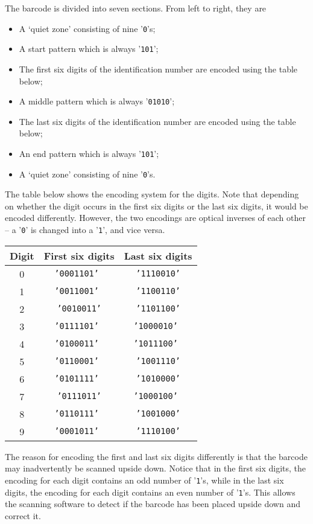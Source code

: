\noindent The barcode is divided into seven sections. From left to
right, they are
\begin{itemize}
\item A \textquoteleft quiet zone\textquoteright{} consisting of nine '\texttt{0}'s; 
\item A start pattern which is always '\texttt{101}'; 
\item The first six digits of the identification number are encoded using
the table below; 
\item A middle pattern which is always '\texttt{01010}'; 
\item The last six digits of the identification number are encoded using
the table below; 
\item An end pattern which is always '\texttt{101}'; 
\item A \textquoteleft quiet zone\textquoteright{} consisting of nine '\texttt{0}'s.
\end{itemize}
\noindent The table below shows the encoding system for the digits.
Note that depending on whether the digit occurs in the first six digits
or the last six digits, it would be encoded differently. However,
the two encodings are optical inverses of each other -- a '\texttt{0}'
is changed into a '\texttt{1}', and vice versa.
\noindent \begin{center}
\begin{tabular}{|c|c|c|}
\hline 
Digit  & First six digits & Last six digits\tabularnewline
\hline 
0  & \texttt{'0001101' } & \texttt{'1110010'}\tabularnewline
\hline 
1  & \texttt{'0011001' } & \texttt{'1100110'}\tabularnewline
\hline 
2  & \texttt{'0010011'} & \texttt{'1101100'}\tabularnewline
\hline 
3  & \texttt{'0111101' } & \texttt{'1000010' }\tabularnewline
\hline 
4  & \texttt{'0100011' } & \texttt{'1011100' }\tabularnewline
\hline 
5  & \texttt{'0110001' } & \texttt{'1001110'}\tabularnewline
\hline 
6  & \texttt{'0101111' } & \texttt{'1010000'}\tabularnewline
\hline 
7  & \texttt{'0111011'} & \texttt{'1000100' }\tabularnewline
\hline 
8  & \texttt{'0110111' } & \texttt{'1001000'}\tabularnewline
\hline 
9  & \texttt{'0001011' } & \texttt{'1110100'}\tabularnewline
\hline 
\end{tabular}
\par\end{center}

\noindent The reason for encoding the first and last six digits differently
is that the barcode may inadvertently be scanned upside down. Notice
that in the first six digits, the encoding for each digit contains
an odd number of '\texttt{1}'s, while in the last six digits, the
encoding for each digit contains an even number of '\texttt{1}'s.
This allows the scanning software to detect if the barcode has been
placed upside down and correct it. \quad{} 

